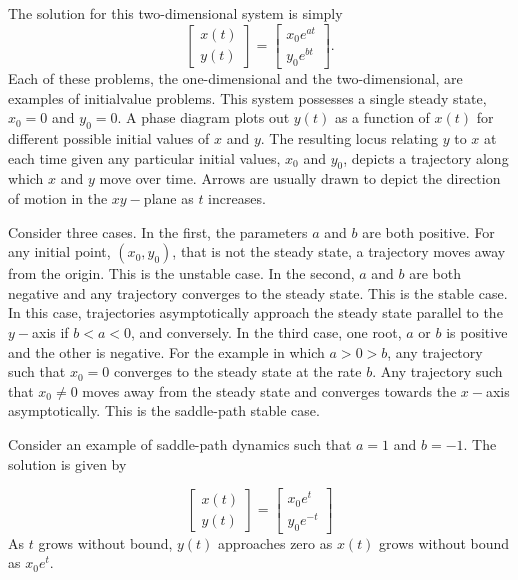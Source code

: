 \documentclass{book}
\begin{document}
The solution for this two-dimensional system is simply
\begin{equation*}
\begin{bmatrix}
x(t)\\y(t)
\end{bmatrix}
=\begin{bmatrix}
x_{0}e^{at}\\y_{0}e^{bt}
\end{bmatrix}.
\end{equation*}
Each of these problems, the one-dimensional and the two-dimensional, are examples of initialvalue problems. This system possesses a single steady state, $x_{0}=0$ and $y_{0}=0$. A phase diagram plots out $y(t)$ as a function of $x(t)$ for different possible initial values of $x$ and $y$. The resulting locus relating $y$ to $x$ at each time given any particular initial values, $x_{0}$ and $y_{0}$, depicts a trajectory along which $x$ and $y$ move over time. Arrows are usually drawn to depict the direction of motion in the $xy-$plane as $t$ increases.

Consider three cases. In the first, the parameters $a$ and $b$ are both positive. For any initial point, $(x_{0},y_{0})$,  that is not the steady state, a trajectory moves away from the origin. This is the unstable case. In the second, $a$ and $b$ are both negative and any trajectory converges to the steady state. This is the stable case. In this case, trajectories asymptotically approach the steady state parallel to the $y-$axis if $b<a<0$, and conversely. In the third case, one root, $a$ or $b$ is positive and the other is negative. For the example in which $a>0>b$, any trajectory such that $x_{0}=0$ converges to the steady state at the rate $b$. Any trajectory such that $x_{0}\not =0$ moves away from the steady state and converges towards the $x-$axis asymptotically. This is the saddle-path stable case.

Consider an example of saddle-path dynamics such that $a=1$ and $b=−1$. The solution is given by

\begin{equation*}
\begin{bmatrix}
x(t)\\
y(t)
\end{bmatrix}
= \begin{bmatrix}
x_{0}e^{t}\\
y_{0}e^{-t}
\end{bmatrix}
\end{equation*}
As $t$ grows without bound, $y(t)$ approaches zero as $x(t)$ grows without bound as $x_{0}e^{t}$.
\end{document}

